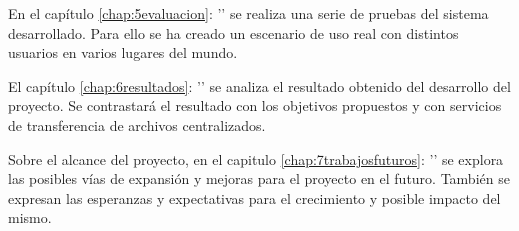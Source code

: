 En el capítulo \ref{chap:5evaluacion}: '' se realiza una
serie de pruebas del sistema desarrollado. Para ello se ha creado un escenario de uso real con distintos usuarios en varios lugares del mundo.

El capítulo \ref{chap:6resultados}: '' se analiza el resultado obtenido del desarrollo del proyecto. Se contrastará
el resultado con los objetivos propuestos y con servicios de transferencia de archivos centralizados.

Sobre el alcance del proyecto, en el capitulo \ref{chap:7trabajosfuturos}: '' se explora las posibles vías de expansión y mejoras para el proyecto en el futuro.
También se expresan las esperanzas y expectativas para el crecimiento y posible impacto del mismo.
